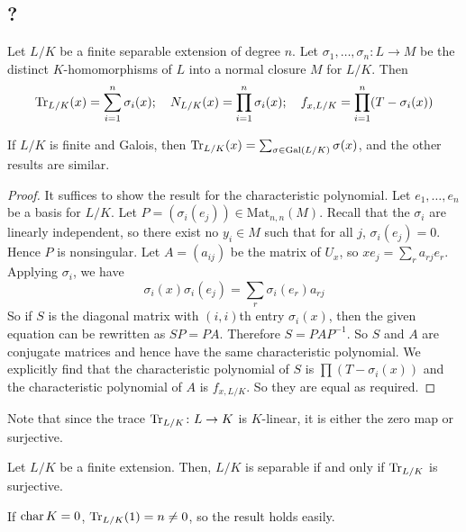 \subsection{?}
\begin{proposition}
	Let \( L / K \) be a finite separable extension of degree \( n \).
	Let \( \sigma_1, \dots, \sigma_n \colon L \to M \) be the distinct \( K \)-homomorphisms of \( L \) into a normal closure \( M \) for \( L / K \).
	Then
	\[ \Tr_{L/K}(x) = \sum_{i=1}^n \sigma_i(x); \quad N_{L/K}(x) = \prod_{i=1}^n \sigma_i(x);\quad f_{x,L/K} = \prod_{i=1}^n (T - \sigma_i(x)) \]
\end{proposition}
\begin{remark}
	If \( L / K \) is finite and Galois, then \( \Tr_{L/K}(x) = \sum_{\sigma \in \operatorname{Gal}(L/K)} \sigma(x) \), and the other results are similar.
\end{remark}
\begin{proof}
	It suffices to show the result for the characteristic polynomial.
	Let \( e_1, \dots, e_n \) be a basis for \( L / K \).
	Let \( P = (\sigma_i(e_j)) \in \mathrm{Mat}_{n,n}(M) \).
	Recall that the \( \sigma_i \) are linearly independent, so there exist no \( y_i \in M \) such that for all \( j \), \( \sigma_i(e_j) = 0 \).
	Hence \( P \) is nonsingular.
	Let \( A = (a_{ij}) \) be the matrix of \( U_x \), so \( xe_j = \sum_r a_{rj} e_r \).
	Applying \( \sigma_i \), we have
	\[ \sigma_i(x) \sigma_i(e_j) = \sum_r \sigma_i(e_r) a_{rj} \]
	So if \( S \) is the diagonal matrix with \( (i,i) \)th entry \( \sigma_i(x) \), then the given equation can be rewritten as \( SP = PA \).
	Therefore \( S = PAP^{-1} \).
	So \( S \) and \( A \) are conjugate matrices and hence have the same characteristic polynomial.
	We explicitly find that the characteristic polynomial of \( S \) is \( \prod(T - \sigma_i(x)) \) and the characteristic polynomial of \( A \) is \( f_{x,L/K} \).
	So they are equal as required.
\end{proof}
Note that since the trace \( \Tr_{L/K} \colon L \to K \) is \( K \)-linear, it is either the zero map or surjective.
\begin{theorem}
	Let \( L / K \) be a finite extension.
	Then, \( L / K \) is separable if and only if \( \Tr_{L/K} \) is surjective.
\end{theorem}
\begin{remark}
	If \( \operatorname{char} K = 0 \), \( \Tr_{L/K}(1) = n \neq 0 \), so the result holds easily.
\end{remark}
